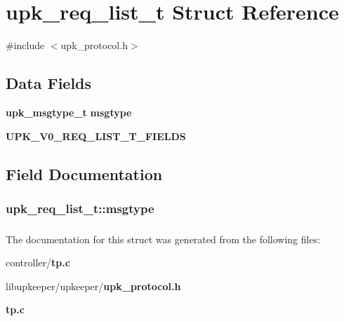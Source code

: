 \section{upk\_\-req\_\-list\_\-t Struct Reference}
\label{structupk__req__list__t}


{\ttfamily \#include $<$upk\_\-protocol.h$>$}

\subsection*{Data Fields}
\begin{DoxyCompactItemize}
\item 
{\bf upk\_\-msgtype\_\-t} {\bf msgtype}
\item 
{\bf UPK\_\-V0\_\-REQ\_\-LIST\_\-T\_\-FIELDS}
\end{DoxyCompactItemize}


\subsection{Field Documentation}
\subsubsection[{msgtype}]{ {\bf upk\_\-req\_\-list\_\-t::msgtype}}\label{structupk__req__list__t_ac7480e46307ac875c9a44b81ba86cd16}
\subsubsection[{UPK\_\-V0\_\-REQ\_\-LIST\_\-T\_\-FIELDS}]{}\label{structupk__req__list__t_ae9269a149b7751fe056f25e9164bd980}


The documentation for this struct was generated from the following files:\begin{DoxyCompactItemize}
\item 
controller/{\bf tp.c}\item 
libupkeeper/upkeeper/{\bf upk\_\-protocol.h}\item 
{\bf tp.c}\end{DoxyCompactItemize}
